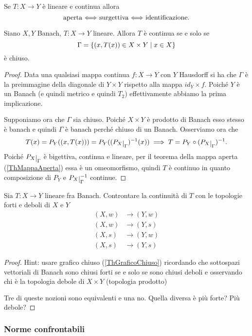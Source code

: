 \begin{remark}
Se $T:X\to Y$ \`e lineare e continua allora
\[\text{aperta $\Longleftrightarrow$ surgettiva $\Longleftrightarrow$ identificazione.}\]
\end{remark}

\begin{theorem}\label{ThGraficoChiuso}
Siano $X,Y$ Banach, $T:X\to Y$ lineare. Allora $T$ \`e continua se e solo se
\[\Gamma=\left\{{(x,T(x))\in X\times Y\mid x\in X}\right\}\]
\`e chiuso.
\end{theorem}
\begin{proof}
Data una qualsiasi mappa continua $f:X\to Y$ con $Y$ Hausdorff si ha che $\Gamma$ \`e la preimmagine della diagonale di $Y\times Y$ rispetto alla mappa $id_Y\times f$. Poich\'e $Y$ \`e un Banach (e quindi metrico e quindi $T_2$) effettivamente abbiamo la prima implicazione.
\smallskip

Supponiamo ora che $\Gamma$ sia chiuso. Poich\'e $X\times Y$ \`e prodotto di Banach esso stesso \`e banach e quindi $\Gamma$ \`e banach perch\'e chiuso di un Banach. Osserviamo ora che
\[T(x)=P_Y((x,T(x)))=P_Y((P_X\res{\Gamma})\ii(x))\implies T=P_Y\circ(P_X\res{\Gamma})\ii.\]
Poich\'e $P_X\res{\Gamma}$ \`e bigettiva, continua e lineare, per il teorema della mappa aperta (\ref{ThMappaAperta}) essa \`e un omeomorfismo, quindi $T$ \`e continuo in quanto composizione di $P_Y$ e $P_X\res{\Gamma}\ii$ continue.
\end{proof}

\begin{exercise}
Sia $T:X\to Y$ lineare fra Banach. Controntare la continuit\`a di $T$ con le topologie forti e deboli di $X$ e $Y$
\begin{align*}
(X,w)&\to (Y,w)\\
(X,w)&\to (Y,s)\\
(X,s)&\to (Y,w)\\
(X,s)&\to (Y,s)
\end{align*}
\end{exercise}
\begin{proof}
Hint: usare grafico chiuso (\ref{ThGraficoChiuso}) ricordando che sottospazi vettoriali di Banach sono chiusi forti se e solo se sono chiusi deboli e osservando chi \`e la topologia debole di $X\times Y$ (topologia prodotto)

Tre di queste nozioni sono equivalenti e una no. Quella diversa \`e pi\`u forte? Pi\`u debole?
\end{proof}


\subsubsection{Norme confrontabili}

